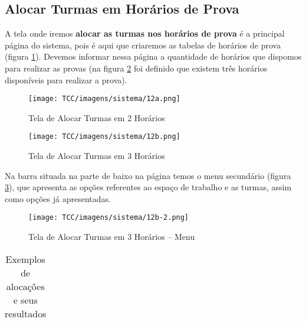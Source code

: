 \begin{anexosenv}
\subsection{Alocar Turmas em Horários de Prova}

A tela onde iremos \textbf{alocar as turmas nos horários de prova} é a principal página do sistema, pois é aqui que criaremos as tabelas de horários de prova (figura \ref{tela-aloc-2h}). Devemos informar nessa página a quantidade de horários que dispomos para realizar as provas (na figura \ref{tela-aloc-3h} foi definido que existem três horários disponíveis para realizar a prova).
\begin{figure}[H]
     \centering
     \texttt{[image: TCC/imagens/sistema/12a.png]}
     \caption{Tela de Alocar Turmas em 2 Horários}
     \label{tela-aloc-2h}
\end{figure}

\begin{figure}[H]
     \centering
     \texttt{[image: TCC/imagens/sistema/12b.png]}
     \caption{Tela de Alocar Turmas em 3 Horários}
     \label{tela-aloc-3h}
\end{figure}

Na barra situada na parte de baixo na página temos o menu secundário (figura \ref{tela-aloc-menu}), que apresenta as opções referentes ao espaço de trabalho e as turmas, assim como opções já apresentadas.
\begin{figure}[H]
     \centering
     \texttt{[image: TCC/imagens/sistema/12b-2.png]}
     \caption{Tela de Alocar Turmas em 3 Horários -- Menu}
     \label{tela-aloc-menu}
\end{figure}



    \begin{table}[h]
        \centering
        \caption{Exemplos de alocações e seus resultados}
        \vspace{0.5cm}
        \renewcommand\arraystretch{1.5}
        \begin{tabular}{c|c|c|c|c}
         

\end{tabular}
\end{table}
\end{anexosenv}
